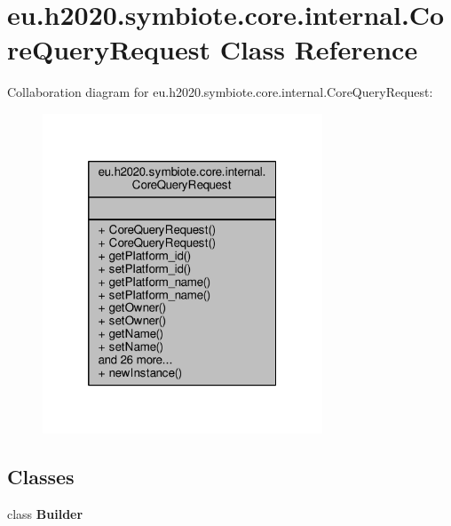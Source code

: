 \hypertarget{classeu_1_1h2020_1_1symbiote_1_1core_1_1internal_1_1CoreQueryRequest}{}\section{eu.\+h2020.\+symbiote.\+core.\+internal.\+Core\+Query\+Request Class Reference}
\label{classeu_1_1h2020_1_1symbiote_1_1core_1_1internal_1_1CoreQueryRequest}


Collaboration diagram for eu.\+h2020.\+symbiote.\+core.\+internal.\+Core\+Query\+Request\+:
\nopagebreak
\begin{figure}[H]
\begin{center}
\leavevmode
\includegraphics[width=236pt]{classeu_1_1h2020_1_1symbiote_1_1core_1_1internal_1_1CoreQueryRequest__coll__graph}
\end{center}
\end{figure}
\subsection*{Classes}
\begin{DoxyCompactItemize}
\item 
class {\bfseries Builder}
\end{DoxyCompactItemize}
